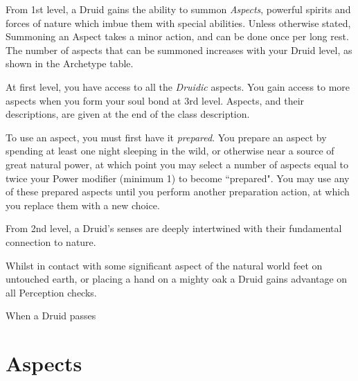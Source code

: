 {
From 1st level, a Druid gains the ability to summon {\it Aspects}, powerful spirits and forces of nature which imbue them with special abilities. Unless otherwise stated, Summoning an Aspect takes a minor action, and can be done once per long rest. The number of aspects that can be summoned increases with your Druid level, as shown in the Archetype table. 

At first level, you have access to all the {\it Druidic} aspects. You gain access to more aspects when you form your soul bond at 3rd level. Aspects, and their descriptions, are given at the end of the class description. 

To use an aspect, you must first have it {\it prepared}. You prepare an aspect by spending at least one night sleeping in the wild, or otherwise near a source of great natural power, at which point you may select a number of aspects equal to twice your Power modifier (minimum 1) to become ``prepared". You may use any of these prepared aspects until you perform another preparation action, at which you replace them with a new choice.
}
{
From 2nd level, a Druid's senses are deeply intertwined with their fundamental connection to nature. 

Whilst in contact with some significant aspect of the natural world \minus{} feet on untouched earth, or placing a hand on a mighty oak \minus{} a Druid gains advantage on all Perception checks. 
}


{
	When a Druid passes
}

\section*{Aspects}

 

 
